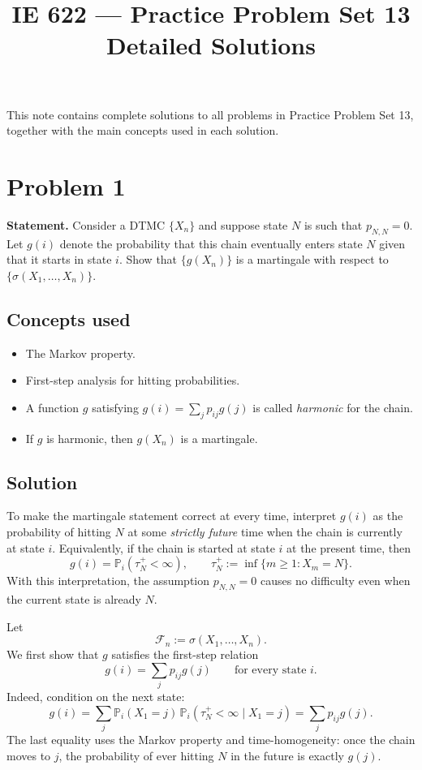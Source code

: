 \documentclass[11pt]{article}
\title{IE 622 --- Practice Problem Set 13\\Detailed Solutions}
\author{}
\date{}
\newcommand{\PP}{\mathbb{P}}
\newcommand{\cF}{\mathcal{F}}
\begin{document}
\maketitle

\noindent
This note contains complete solutions to all problems in Practice Problem Set 13, together
with the main concepts used in each solution.

\section*{Problem 1}

\textbf{Statement.} Consider a DTMC $\{X_n\}$ and suppose state $N$ is such that
$p_{N,N}=0$. Let $g(i)$ denote the probability that this chain eventually enters state $N$
given that it starts in state $i$. Show that $\{g(X_n)\}$ is a martingale with respect to
$\{\sigma(X_1,\dots,X_n)\}$.

\subsection*{Concepts used}

\begin{itemize}
\item The Markov property.
\item First-step analysis for hitting probabilities.
\item A function $g$ satisfying $g(i)=\sum_j p_{ij}g(j)$ is called \emph{harmonic} for the chain.
\item If $g$ is harmonic, then $g(X_n)$ is a martingale.
\end{itemize}

\subsection*{Solution}

To make the martingale statement correct at every time, interpret $g(i)$ as the probability
of hitting $N$ at some \emph{strictly future} time when the chain is currently at state $i$.
Equivalently, if the chain is started at state $i$ at the present time, then
\[
g(i)=\PP_i(\tau_N^+<\infty),
\qquad
\tau_N^+ := \inf\{m\ge 1 : X_m=N\}.
\]
With this interpretation, the assumption $p_{N,N}=0$ causes no difficulty even when the
current state is already $N$.

Let
\[
\cF_n := \sigma(X_1,\dots,X_n).
\]
We first show that $g$ satisfies the first-step relation
\[
g(i)=\sum_j p_{ij}g(j)
\qquad \text{for every state } i.
\]
Indeed, condition on the next state:
\[
g(i)
= \sum_j \PP_i(X_{1}=j)\,\PP_i(\tau_N^+<\infty \mid X_1=j)
= \sum_j p_{ij} g(j).
\]
The last equality uses the Markov property and time-homogeneity: once the chain moves to $j$,
the probability of ever hitting $N$ in the future is exactly $g(j)$.
\end{document}
